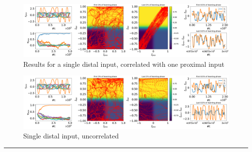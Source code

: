 \documentclass{beamer}
\begin{document}
\begin{frame}[t]
\begin{columns}[t]
\begin{column}{.5\textwidth}
\begin{figure}
\includegraphics[width=\textwidth]{../figures/fig2.pdf}
\caption{Results for a single distal input, correlated with one proximal input}
\label{fig:Results_1}
\end{figure}

\begin{figure}
\includegraphics[width=\textwidth]{../figures/fig3.pdf}
\caption{Single distal input, uncorrelated}
\label{fig:Results_2}
\end{figure}

\noindent\rule{\textwidth}{2px}
\begin{small}


\end{small}
\end{column}
\end{columns}
\end{frame}
\end{document}
